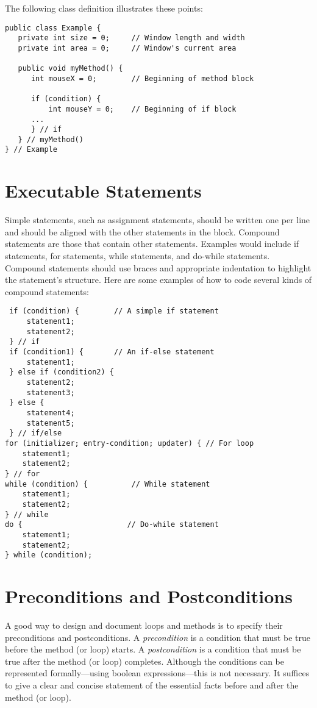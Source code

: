 \noindent The following class definition illustrates these points:

\begin{jjjlisting}
\begin{lstlisting}
public class Example {
   private int size = 0;     // Window length and width
   private int area = 0;     // Window's current area

   public void myMethod() {
      int mouseX = 0;        // Beginning of method block

      if (condition) {
          int mouseY = 0;    // Beginning of if block
      ...
      } // if
   } // myMethod()
} // Example
\end{lstlisting}
\end{jjjlisting}


\section*{Executable Statements}
\noindent Simple statements, such as assignment statements, should be written
one per line and should be aligned with the other statements in the
block.   Compound statements are those that contain other
statements.  Examples would include if statements, for statements,
while statements, and do-while statements.  Compound statements should
use braces and appropriate indentation to highlight the statement's
structure.  Here are some examples of how to code several kinds of
compound statements:

\begin{jjjlisting}[27pc]
\begin{lstlisting}
 if (condition) {        // A simple if statement
     statement1;
     statement2;
 } // if
 if (condition1) {       // An if-else statement
     statement1;
 } else if (condition2) {
     statement2;
     statement3;
 } else {
     statement4;
     statement5;
 } // if/else
for (initializer; entry-condition; updater) { // For loop
    statement1;
    statement2;
} // for
while (condition) {          // While statement
    statement1;
    statement2;
} // while
do {                        // Do-while statement
    statement1;
    statement2;
} while (condition);
\end{lstlisting}
\end{jjjlisting}

\section*{Preconditions and Postconditions}
\noindent A good way to design and document loops and methods is to specify
their preconditions and postconditions.  A {\it precondition} is a
condition that must be true before the method (or loop) starts.  A {\it
postcondition} is a condition that must be true after the method (or
loop) completes.   Although the conditions can be represented 
formally---using boolean expressions---this is not necessary.  It suffices
to give a clear and concise statement of the essential facts before
and after the method (or loop).

